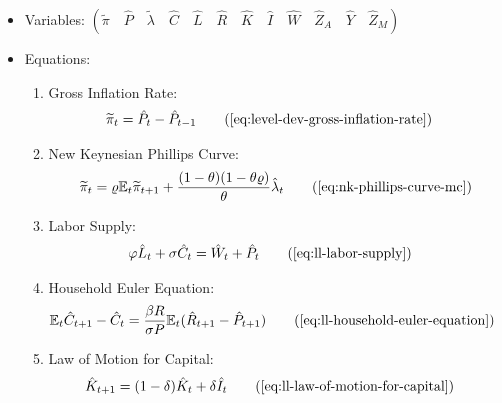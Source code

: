 \documentclass[
	thesis.tex
	]{subfiles}
\begin{document}
{\singlespacing
	
	\begin{itemize}
		
		\item Variables: \( \left( \tilde{\pi} \quad \hat{P} \quad \tilde{\lambda} \quad \hat{C} \quad \hat{L} \quad \hat{R} \quad \hat{K} \quad \hat{I} \quad \hat{W} \quad \hat{Z}_A \quad \hat{Y} \quad \hat{Z}_M \right) \)
		
		\item Equations:
		
		\begin{enumerate}
			
			\item Gross Inflation Rate:
			\begin{align}
				\widetilde{\pi}_t &= \hat{P}_t - \hat{P}_{t-1}
				\tag{\ref{eq:level-dev-gross-inflation-rate}}
			\end{align}
			
			\item New Keynesian Phillips Curve:
			\begin{align}
				\widetilde{\pi}_t = \varrho \E \widetilde{\pi}_{t+1} + \frac{(1-\theta) (1- \theta \varrho)}{\theta} \hat{\lambda}_t
				\tag{\ref{eq:nk-phillips-curve-mc}}
			\end{align}
			
			\item Labor Supply:
			\begin{align}
				\varphi \hat{L}_t + \sigma \hat{C}_t &= \hat{W}_t + \hat{P}_t
				\tag{\ref{eq:ll-labor-supply}}
			\end{align}
			
			\item Household Euler Equation:
			\begin{align}
				\E \hat{C}_{t+1} - \hat{C}_t &= \frac{\beta R}{\sigma P} \E(\hat{R}_{t+1} - \hat{P}_{t+1})
				\tag{\ref{eq:ll-household-euler-equation}}
			\end{align}
			
			\item Law of Motion for Capital:
			\begin{align}
				\hat{K}_{t+1} &= (1-\delta)\hat{K}_t + \delta \hat{I}_t
				\tag{\ref{eq:ll-law-of-motion-for-capital}}
			\end{align}
			
			

\end{enumerate}
\end{itemize}}
\end{document}
